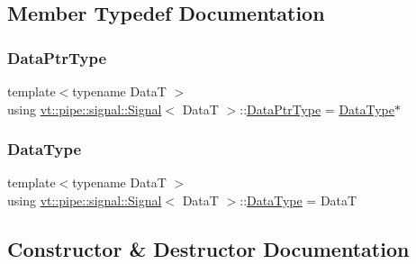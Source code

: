 \subsection{Member Typedef Documentation}
\mbox{\label{structvt_1_1pipe_1_1signal_1_1_signal_a9c8166338314e5d595575c21eaa42859}} 
\subsubsection{\texorpdfstring{Data\+Ptr\+Type}{DataPtrType}}
{\footnotesize\ttfamily template$<$typename DataT $>$ \\
using \hyperlink{structvt_1_1pipe_1_1signal_1_1_signal}{vt\+::pipe\+::signal\+::\+Signal}$<$ DataT $>$\+::\hyperlink{structvt_1_1pipe_1_1signal_1_1_signal_a9c8166338314e5d595575c21eaa42859}{Data\+Ptr\+Type} =  \hyperlink{structvt_1_1pipe_1_1signal_1_1_signal_af5f782c77d6c762dc35fc097cce53732}{Data\+Type}$\ast$}

\mbox{\label{structvt_1_1pipe_1_1signal_1_1_signal_af5f782c77d6c762dc35fc097cce53732}} 
\subsubsection{\texorpdfstring{Data\+Type}{DataType}}
{\footnotesize\ttfamily template$<$typename DataT $>$ \\
using \hyperlink{structvt_1_1pipe_1_1signal_1_1_signal}{vt\+::pipe\+::signal\+::\+Signal}$<$ DataT $>$\+::\hyperlink{structvt_1_1pipe_1_1signal_1_1_signal_af5f782c77d6c762dc35fc097cce53732}{Data\+Type} =  DataT}



\subsection{Constructor \& Destructor Documentation}
\mbox{\label{structvt_1_1pipe_1_1signal_1_1_signal_a019363b72392fcf448dc72194f66166f}} 
